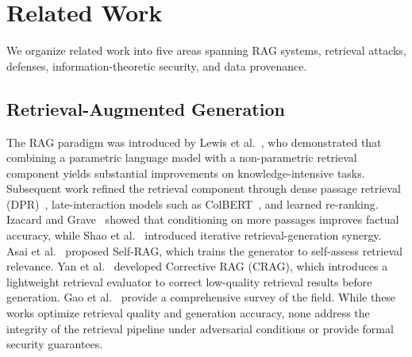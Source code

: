 \documentclass[journal,10pt]{IEEEtran}
\begin{document}
\section{Related Work}\label{sec:related}
We organize related work into five areas spanning RAG systems, retrieval attacks, defenses, information-theoretic security, and data provenance.

\subsection{Retrieval-Augmented Generation}
The RAG paradigm was introduced by Lewis et al.~\cite{lewis2020rag}, who demonstrated that combining a parametric language model with a non-parametric retrieval component yields substantial improvements on knowledge-intensive tasks. Subsequent work refined the retrieval component through dense passage retrieval (DPR)~\cite{karpukhin2020dense}, late-interaction models such as ColBERT~\cite{khattab2020colbert}, and learned re-ranking. Izacard and Grave~\cite{izacard2021leveraging} showed that conditioning on more passages improves factual accuracy, while Shao et al.~\cite{shao2023iterative} introduced iterative retrieval-generation synergy. Asai et al.~\cite{asai2024selfrag} proposed Self-RAG, which trains the generator to self-assess retrieval relevance. Yan et al.~\cite{yan2024corrective} developed Corrective RAG (CRAG), which introduces a lightweight retrieval evaluator to correct low-quality retrieval results before generation. Gao et al.~\cite{gao2024ragsurvey} provide a comprehensive survey of the field. While these works optimize retrieval quality and generation accuracy, none address the integrity of the retrieval pipeline under adversarial conditions or provide formal security guarantees.
\end{document}
